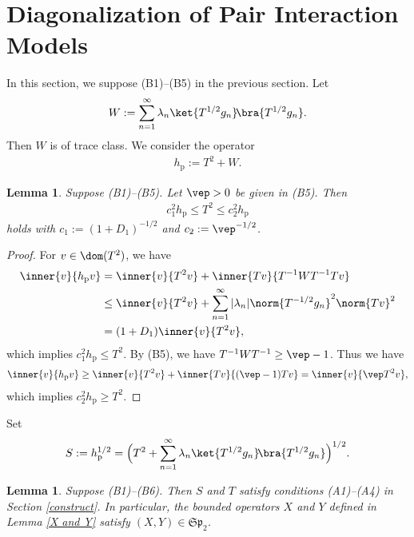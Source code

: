 \documentclass[12pt,draft]{article}
\theoremstyle{plain}
\newtheorem{lem}[theorem]{\bf Lemma}
\numberwithin{equation}{section}
\theoremstyle{remark}
\begin{document}
\section{Diagonalization of Pair Interaction Models}\label{Diagonalization}
In this section, we suppose (B1)--(B5) in the previous section.
Let 
\begin{align}
W := \sum_{n=1}^\infty \lambda_n \ket{T^{1/2}g_n}\! \bra{T^{1/2}g_n}.   \label{Wdef}
\end{align}
Then $W$ is of trace class. 
We consider the operator
\begin{align*}
  h_\mathrm{p} := T^2 + W.
\end{align*}
\begin{lem}\label{bdhp}
  Suppose (B1)--(B5). 
Let $\vep>0$ be given in (B5).
Then
\begin{align*}
    c_1^2 h_\mathrm{p} \leq T^2 \leq c_2^2h_\mathrm{p}
\end{align*}
holds with $c_1 := (1+D_1)^{-1/2}$ and $c_2 := \vep^{-1/2}$.
\end{lem}

\begin{proof}
For $v\in\dom(T^2)$, we have
\begin{align*}
 \inner{v}{h_\mathrm{p}v}
& = \inner{v}{T^2v}+\inner{Tv}{T^{-1}WT^{-1}Tv} \\
 &\leq \inner{v}{T^2v}+\sum_{n=1}^\infty|\lambda_n|  \norm{T^{-1/2}g_n}^2 \norm{Tv}^2 \\
 & = (1+D_1)\inner{v}{T^2v},
\end{align*}
which implies $c_1^2h_\mathrm{p}\leq T^2$. 
By (B5), we have $T^{-1}WT^{-1} \geq \vep-1$. Thus we have
\begin{align*}
 \inner{v}{h_\mathrm{p}v}
 \geq \inner{v}{T^2v} + \inner{Tv}{(\vep-1)Tv} = \inner{v}{\vep T^2v},
\end{align*}
which implies $c_2^2 h_\mathrm{p}\geq T^2$.
\end{proof}
Set
\begin{align}
S:=h_\mathrm{p}^{1/2} = \Big(T^2+\sum_{n=1}^\infty \lambda_n \ket{T^{1/2}g_n}\!\bra{T^{1/2}g_n}\Big)^{1/2}.  \label{defS}
\end{align}
\begin{lem}\label{Bogo OK}
  Suppose (B1)--(B6). Then $S$ and $T$ satisfy conditions (A1)--(A4) in Section \ref{construct}.
In particular, the bounded operators $X$ and $Y$ defined in Lemma \ref{X and Y} satisfy 
$(X,Y)\in\mathfrak{Sp}_2$.
\end{lem}
\end{document}
